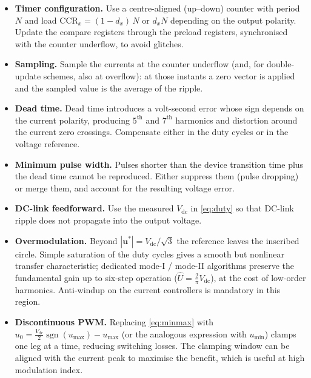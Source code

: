 \documentclass[11pt,a4paper]{article}
\newcommand{\vdc}{V_{\mathrm{dc}}}
\newcommand{\vs}{\bm{u}^{*}}
\begin{document}
\begin{itemize}
\item \textbf{Timer configuration.} Use a centre-aligned (up--down) counter with
period $N$ and load $\mathrm{CCR}_x = (1-d_x)\,N$ or $d_x N$ depending on the output
polarity. Update the compare registers through the preload registers, synchronised
with the counter underflow, to avoid glitches.

\item \textbf{Sampling.} Sample the currents at the counter underflow (and, for
double-update schemes, also at overflow): at those instants a zero vector is applied
and the sampled value is the average of the ripple.

\item \textbf{Dead time.} Dead time introduces a volt-second error whose sign depends
on the current polarity, producing $5^\text{th}$ and $7^\text{th}$ harmonics and
distortion around the current zero crossings. Compensate either in the duty cycles or
in the voltage reference.

\item \textbf{Minimum pulse width.} Pulses shorter than the device transition time
plus the dead time cannot be reproduced. Either suppress them (pulse dropping) or
merge them, and account for the resulting voltage error.

\item \textbf{DC-link feedforward.} Use the measured $\vdc$ in \eqref{eq:duty} so
that DC-link ripple does not propagate into the output voltage.

\item \textbf{Overmodulation.} Beyond $|\vs| = \vdc/\sqrt{3}$ the reference leaves
the inscribed circle. Simple saturation of the duty cycles gives a smooth but
nonlinear transfer characteristic; dedicated mode-I / mode-II algorithms preserve the
fundamental gain up to six-step operation ($\hat U = \tfrac{2}{\pi}\vdc$), at the cost
of low-order harmonics. Anti-windup on the current controllers is mandatory in this
region.

\item \textbf{Discontinuous PWM.} Replacing \eqref{eq:minmax} with
$u_0 = \tfrac{\vdc}{2}\operatorname{sgn}(u_{\max}) - u_{\max}$ (or the analogous
expression with $u_{\min}$) clamps one leg at a time, reducing switching losses.
The clamping window can be aligned with the current peak to maximise the benefit,
which is useful at high modulation index.
\end{itemize}
\end{document}
